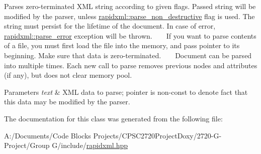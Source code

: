Parses zero-\/terminated X\+ML string according to given flags. Passed string will be modified by the parser, unless \mbox{\hyperlink{namespacerapidxml_a45d4d8fef551beaaba23a83b847fd6a3}{rapidxml\+::parse\+\_\+non\+\_\+destructive}} flag is used. The string must persist for the lifetime of the document. In case of error, \mbox{\hyperlink{classrapidxml_1_1parse__error}{rapidxml\+::parse\+\_\+error}} exception will be thrown. ~\newline
~\newline
 If you want to parse contents of a file, you must first load the file into the memory, and pass pointer to its beginning. Make sure that data is zero-\/terminated. ~\newline
~\newline
 Document can be parsed into multiple times. Each new call to parse removes previous nodes and attributes (if any), but does not clear memory pool. 
\begin{DoxyParams}{Parameters}
{\em text} & X\+ML data to parse; pointer is non-\/const to denote fact that this data may be modified by the parser. \\
\hline
\end{DoxyParams}


The documentation for this class was generated from the following file\+:\begin{DoxyCompactItemize}
\item 
A\+:/\+Documents/\+Code Blocks Projects/\+C\+P\+S\+C2720\+Project\+Doxy/2720-\/\+G-\/\+Project/\+Group G/include/\mbox{\hyperlink{include_2rapidxml_8hpp}{rapidxml.\+hpp}}\end{DoxyCompactItemize}
